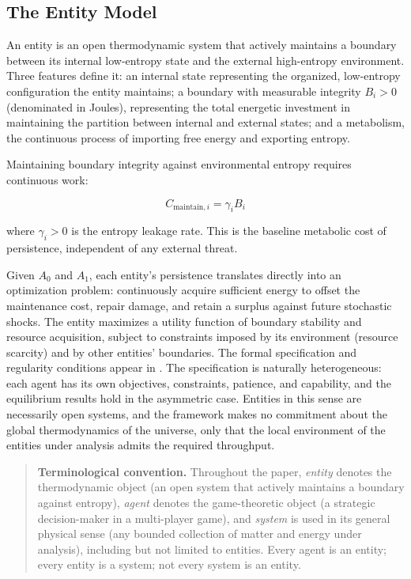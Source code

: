 \documentclass[11pt]{article}
\theoremstyle{plain}
\theoremstyle{definition}
\theoremstyle{remark}
\let\origsubsection\subsection
\renewcommand{\subsection}{\needspace{7\baselineskip}\origsubsection}
\begin{document}
\subsection{The Entity Model}\label{the-entity-model}

An entity is an open thermodynamic system that actively maintains a
boundary between its internal low-entropy state and the external
high-entropy environment. Three features define it: an internal state
representing the organized, low-entropy configuration the entity
maintains; a boundary with measurable integrity \(B_i > 0\) (denominated
in Joules), representing the total energetic investment in maintaining
the partition between internal and external states; and a metabolism,
the continuous process of importing free energy and exporting entropy.

Maintaining boundary integrity against environmental entropy requires
continuous work:

\[C_{\text{maintain},i} = \gamma_i B_i\]

where \(\gamma_i > 0\) is the entropy leakage rate. This is the baseline
metabolic cost of persistence, independent of any external threat.

Given \(A_0\) and \(A_1\), each entity's persistence translates directly
into an optimization problem: continuously acquire sufficient energy to
offset the maintenance cost, repair damage, and retain a surplus against
future stochastic shocks. The entity maximizes a utility function of
boundary stability and resource acquisition, subject to constraints
imposed by its environment (resource scarcity) and by other entities'
boundaries. The formal specification and regularity conditions appear in
\citep{TC-I}. The specification is naturally heterogeneous: each agent
has its own objectives, constraints, patience, and capability, and the
equilibrium results hold in the asymmetric case. Entities in this sense
are necessarily open systems, and the framework makes no commitment
about the global thermodynamics of the universe, only that the local
environment of the entities under analysis admits the required
throughput.

\begin{quote}
\textbf{Terminological convention.} Throughout the paper, \emph{entity}
denotes the thermodynamic object (an open system that actively maintains
a boundary against entropy), \emph{agent} denotes the game-theoretic
object (a strategic decision-maker in a multi-player game), and
\emph{system} is used in its general physical sense (any bounded
collection of matter and energy under analysis), including but not
limited to entities. Every agent is an entity; every entity is a system;
not every system is an entity.
\end{quote}
\end{document}

